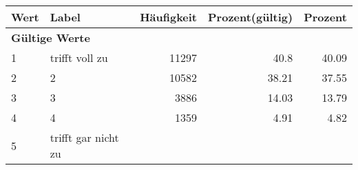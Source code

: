      \begin{longtable}{lXrrr}
     \toprule
     \textbf{Wert} & \textbf{Label} & \textbf{Häufigkeit} & \textbf{Prozent(gültig)} & \textbf{Prozent} \\
     \endhead
     \midrule
     \multicolumn{5}{l}{\textbf{Gültige Werte}}\\

     1 &
     \multicolumn{1}{X}{ trifft voll zu   } &


       \num{11297} &
       \num[round-mode=places,round-precision=2]{40,8} &
         \num[round-mode=places,round-precision=2]{40,09} \\

     2 &
     \multicolumn{1}{X}{ 2   } &


       \num{10582} &
       \num[round-mode=places,round-precision=2]{38,21} &
         \num[round-mode=places,round-precision=2]{37,55} \\

     3 &
     \multicolumn{1}{X}{ 3   } &


       \num{3886} &
       \num[round-mode=places,round-precision=2]{14,03} &
         \num[round-mode=places,round-precision=2]{13,79} \\

     4 &
     \multicolumn{1}{X}{ 4   } &


       \num{1359} &
       \num[round-mode=places,round-precision=2]{4,91} &
         \num[round-mode=places,round-precision=2]{4,82} \\

     5 &
     \multicolumn{1}{X}{ trifft gar nicht zu   } &



\end{longtable}
